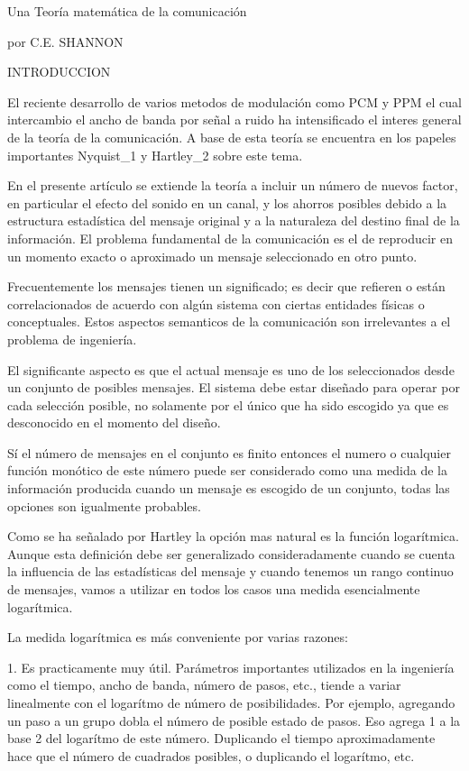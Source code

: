 Una Teoría matemática de la comunicación

por C.E. SHANNON

INTRODUCCION

El reciente desarrollo de varios metodos de modulación como PCM y PPM
el cual intercambio el ancho de banda por señal a ruido ha
intensificado el interes general de la teoría de la comunicación. A
base de esta teoría se encuentra en los papeles importantes
Nyquist_1 y Hartley_2 sobre este tema. 

En el presente artículo se extiende la teoría a incluir un número de
nuevos factor, en particular el efecto del sonido en un canal, y los
ahorros posibles debido a la estructura estadística del mensaje
original y a la naturaleza del destino final de la información. El
problema fundamental de la comunicación es el de reproducir en un
momento exacto o aproximado un mensaje seleccionado en otro punto.

Frecuentemente los mensajes tienen un significado; es decir que
refieren o están correlacionados de acuerdo con algún sistema con
ciertas entidades físicas o conceptuales. Estos aspectos semanticos de
la comunicación son irrelevantes a el problema de ingeniería. 

El significante aspecto es que el actual mensaje es uno de los
seleccionados desde un conjunto de posibles mensajes. El sistema debe
estar diseñado para operar por cada selección posible, no solamente
por el
único que ha sido escogido ya que es desconocido en el momento del
diseño.

Sí el número de mensajes en el conjunto es finito entonces el numero o
cualquier función monótico de este número puede ser considerado como
una medida de la información producida cuando un mensaje es escogido
de un conjunto, todas las opciones son igualmente probables. 

Como se ha señalado por Hartley la opción mas natural es la función
logarítmica. Aunque esta definición debe ser generalizado
consideradamente cuando se cuenta la influencia de las estadísticas
del mensaje y cuando tenemos un rango continuo de mensajes, vamos a
utilizar en todos los casos una medida esencialmente logarítmica.

La medida logarítmica es más conveniente por varias razones:

1. Es practicamente muy útil. Parámetros importantes utilizados en la
ingeniería como el tiempo, ancho de banda, número de pasos, etc.,
tiende a variar linealmente con el logarítmo de número de
posibilidades. Por ejemplo, agregando un paso a un grupo dobla el
número de posible estado de pasos. Eso agrega 1 a la base 2 del
logarítmo de este número. Duplicando el tiempo aproximadamente hace
que el número de cuadrados posibles, o duplicando el logarítmo, etc.

